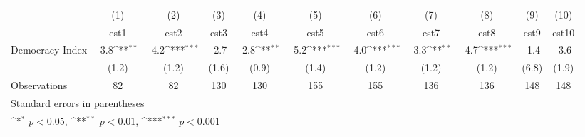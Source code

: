 {
\def\sym#1{\ifmmode^{#1}\else\(^{#1}\)\fi}
\begin{tabular}{l*{10}{c}}
\hline\hline
                    &\multicolumn{1}{c}{(1)}         &\multicolumn{1}{c}{(2)}         &\multicolumn{1}{c}{(3)}         &\multicolumn{1}{c}{(4)}         &\multicolumn{1}{c}{(5)}         &\multicolumn{1}{c}{(6)}         &\multicolumn{1}{c}{(7)}         &\multicolumn{1}{c}{(8)}         &\multicolumn{1}{c}{(9)}         &\multicolumn{1}{c}{(10)}         \\
                    &        est1         &        est2         &        est3         &        est4         &        est5         &        est6         &        est7         &        est8         &        est9         &       est10         \\
\hline
Democracy Index     &        -3.8\sym{**} &        -4.2\sym{***}&        -2.7         &        -2.8\sym{**} &        -5.2\sym{***}&        -4.0\sym{***}&        -3.3\sym{**} &        -4.7\sym{***}&        -1.4         &        -3.6         \\
                    &       (1.2)         &       (1.2)         &       (1.6)         &       (0.9)         &       (1.4)         &       (1.2)         &       (1.2)         &       (1.2)         &       (6.8)         &       (1.9)         \\
\hline
Observations        &          82         &          82         &         130         &         130         &         155         &         155         &         136         &         136         &         148         &         148         \\
\hline\hline
\multicolumn{11}{l}{\footnotesize Standard errors in parentheses}\\
\multicolumn{11}{l}{\footnotesize \sym{*} \(p<0.05\), \sym{**} \(p<0.01\), \sym{***} \(p<0.001\)}\\
\end{tabular}
}
